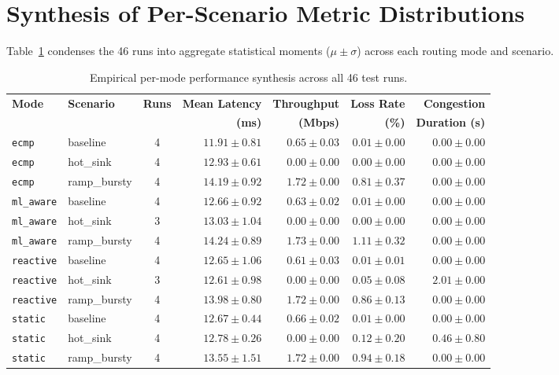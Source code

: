 \section{Synthesis of Per-Scenario Metric Distributions}
Table~\ref{tab:scenario_aggregate} condenses the 46 runs into aggregate statistical moments ($\mu \pm \sigma$) across each routing mode and scenario.

\begin{table}[H]
  \centering
  \small
  \caption{Empirical per-mode performance synthesis across all 46 test runs.}
  \label{tab:scenario_aggregate}
  \begin{tabularx}{\textwidth}{l l c r r r r}
    \toprule
    \textbf{Mode} & \textbf{Scenario} & \textbf{Runs} & \textbf{Mean Latency} & \textbf{Throughput} & \textbf{Loss Rate} & \textbf{Congestion} \\
    & & & \textbf{(ms)} & \textbf{(Mbps)} & \textbf{(\%)} & \textbf{Duration (s)} \\
    \midrule
    \texttt{ecmp} & baseline & 4 & $11.91 \pm 0.81$ & $0.65 \pm 0.03$ & $0.01 \pm 0.00$ & $0.00 \pm 0.00$ \\
    \texttt{ecmp} & hot\_sink & 4 & $12.93 \pm 0.61$ & $0.00 \pm 0.00$ & $0.00 \pm 0.00$ & $0.00 \pm 0.00$ \\
    \texttt{ecmp} & ramp\_bursty & 4 & $14.19 \pm 0.92$ & $1.72 \pm 0.00$ & $0.81 \pm 0.37$ & $0.00 \pm 0.00$ \\
    \midrule
    \texttt{ml\_aware} & baseline & 4 & $12.66 \pm 0.92$ & $0.63 \pm 0.02$ & $0.01 \pm 0.00$ & $0.00 \pm 0.00$ \\
    \texttt{ml\_aware} & hot\_sink & 3 & $13.03 \pm 1.04$ & $0.00 \pm 0.00$ & $0.00 \pm 0.00$ & $0.00 \pm 0.00$ \\
    \texttt{ml\_aware} & ramp\_bursty & 4 & $14.24 \pm 0.89$ & $\mathbf{1.73 \pm 0.00}$ & $1.11 \pm 0.32$ & $0.00 \pm 0.00$ \\
    \midrule
    \texttt{reactive} & baseline & 4 & $12.65 \pm 1.06$ & $0.61 \pm 0.03$ & $0.01 \pm 0.01$ & $0.00 \pm 0.00$ \\
    \texttt{reactive} & hot\_sink & 3 & $12.61 \pm 0.98$ & $0.00 \pm 0.00$ & $0.05 \pm 0.08$ & $2.01 \pm 0.00$ \\
    \texttt{reactive} & ramp\_bursty & 4 & $13.98 \pm 0.80$ & $1.72 \pm 0.00$ & $0.86 \pm 0.13$ & $0.00 \pm 0.00$ \\
    \midrule
    \texttt{static} & baseline & 4 & $12.67 \pm 0.44$ & $0.66 \pm 0.02$ & $0.01 \pm 0.00$ & $0.00 \pm 0.00$ \\
    \texttt{static} & hot\_sink & 4 & $12.78 \pm 0.26$ & $0.00 \pm 0.00$ & $0.12 \pm 0.20$ & $0.46 \pm 0.80$ \\
    \texttt{static} & ramp\_bursty & 4 & $13.55 \pm 1.51$ & $1.72 \pm 0.00$ & $0.94 \pm 0.18$ & $0.00 \pm 0.00$ \\
    \bottomrule
  \end{tabularx}
\end{table}
